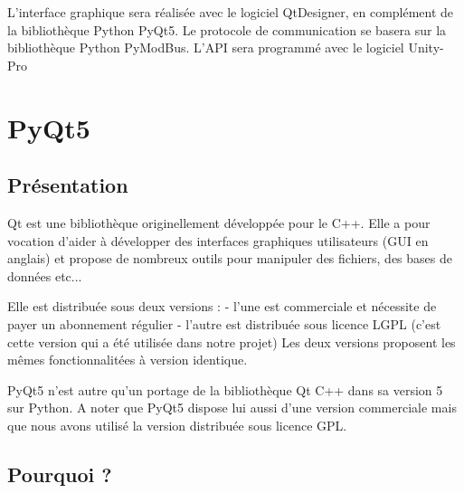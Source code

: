 L'interface graphique sera réalisée avec le logiciel QtDesigner, en complément de la bibliothèque Python PyQt5.
Le protocole de communication se basera sur la bibliothèque Python PyModBus.
L'API sera programmé avec le logiciel Unity-Pro

\section{PyQt5}

\subsection{Présentation}

Qt est une bibliothèque originellement développée pour le C++. Elle a pour vocation d'aider à développer des interfaces graphiques utilisateurs (GUI en anglais) et propose de nombreux outils pour manipuler des fichiers, des bases de données etc...\newline

Elle est distribuée sous deux versions : \newline
- l'une est commerciale et nécessite de payer un abonnement régulier\newline
- l'autre est distribuée sous licence LGPL (c'est cette version qui a été utilisée dans notre projet)
\smallSkip
Les deux versions proposent les mêmes fonctionnalitées à version identique.

\smallSkip
PyQt5 n'est autre qu'un portage de la bibliothèque Qt C++ dans sa version 5 sur Python.\newline
A noter que PyQt5 dispose lui aussi d'une version commerciale mais que nous avons utilisé la version distribuée sous licence GPL.

\subsection{Pourquoi ?}

